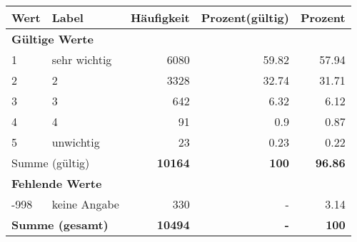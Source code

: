      \begin{longtable}{lXrrr}
     \toprule
     \textbf{Wert} & \textbf{Label} & \textbf{Häufigkeit} & \textbf{Prozent(gültig)} & \textbf{Prozent} \\
     \endhead
     \midrule
     \multicolumn{5}{l}{\textbf{Gültige Werte}}\\

     1 &
     \multicolumn{1}{X}{ sehr wichtig   } &


       \num{6080} &
       \num[round-mode=places,round-precision=2]{59.82} &
         \num[round-mode=places,round-precision=2]{57.94} \\

     2 &
     \multicolumn{1}{X}{ 2   } &


       \num{3328} &
       \num[round-mode=places,round-precision=2]{32.74} &
         \num[round-mode=places,round-precision=2]{31.71} \\

     3 &
     \multicolumn{1}{X}{ 3   } &


       \num{642} &
       \num[round-mode=places,round-precision=2]{6.32} &
         \num[round-mode=places,round-precision=2]{6.12} \\

     4 &
     \multicolumn{1}{X}{ 4   } &


       \num{91} &
       \num[round-mode=places,round-precision=2]{0.9} &
         \num[round-mode=places,round-precision=2]{0.87} \\

     5 &
     \multicolumn{1}{X}{ unwichtig   } &


       \num{23} &
       \num[round-mode=places,round-precision=2]{0.23} &
         \num[round-mode=places,round-precision=2]{0.22} \\
     \midrule
     \multicolumn{2}{l}{Summe (gültig)} &
       \textbf{\num{10164}} &
     \textbf{\num{100}} &
       \textbf{\num[round-mode=places,round-precision=2]{96.86}} \\
     \multicolumn{5}{l}{\textbf{Fehlende Werte}}\\
       -998 &
       keine Angabe &
         \num{330} &
        - &
         \num[round-mode=places,round-precision=2]{3.14} \\
     \midrule
     \multicolumn{2}{l}{\textbf{Summe (gesamt)}} &
          \textbf{\num{10494}} &
        \textbf{-} &
        \textbf{\num{100}} \\
     \bottomrule
     \end{longtable}
     

